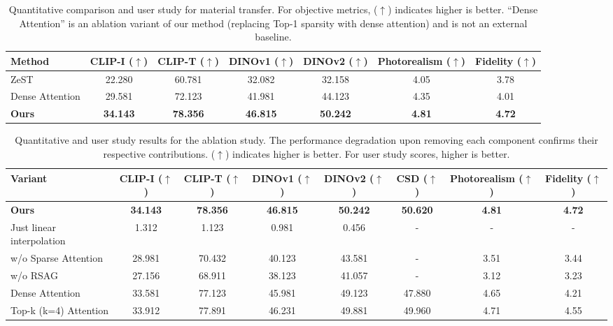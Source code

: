 \begin{table}[htbp]
\centering
\small
\begin{tabular}{lcccccc}
\toprule
Method  & CLIP-I ($\uparrow$) & CLIP-T ($\uparrow$) & DINOv1 ($\uparrow$) & DINOv2 ($\uparrow$) & Photorealism ($\uparrow$) & Fidelity ($\uparrow$) \\
\midrule
ZeST  & 22.280 & 60.781 & 32.082 & 32.158 & 4.05 & 3.78 \\
Dense Attention & 29.581 & 72.123 & 41.981 & 44.123 & 4.35 & 4.01 \\
\textbf{Ours}  & \textbf{34.143} & \textbf{78.356} & \textbf{46.815} & \textbf{50.242} & \textbf{4.81} & \textbf{4.72} \\
\bottomrule
\end{tabular}

\caption{Quantitative comparison and user study for material transfer. For objective metrics, ($\uparrow$) indicates higher is better. ``Dense Attention'' is an ablation variant of our method (replacing Top-1 sparsity with dense attention) and is not an external baseline.}
\label{tab:material_transfer_metrics}
\end{table}

\begin{table}[!h]
\centering
\small
\begin{tabular}{lccccccc}
\toprule
Variant & CLIP-I ($\uparrow$) & CLIP-T ($\uparrow$) & DINOv1 ($\uparrow$) & DINOv2 ($\uparrow$) & CSD ($\uparrow$) & Photorealism ($\uparrow$) & Fidelity ($\uparrow$) \\
\midrule
\textbf{Ours} & \textbf{34.143} & \textbf{78.356} & \textbf{46.815} & \textbf{50.242} & \textbf{50.620} & \textbf{4.81} & \textbf{4.72} \\
 Just linear interpolation & 1.312 & 1.123 & 0.981 & 0.456 & - & - & - \\
w/o Sparse Attention & 28.981 & 70.432 & 40.123 & 43.581 & - & 3.51 & 3.44 \\
w/o RSAG & 27.156 & 68.911 & 38.123 & 41.057 & - & 3.12 & 3.23 \\
\midrule
Dense Attention & 33.581 & 77.123 & 45.981 & 49.123 & 47.880 & 4.65 & 4.21 \\
Top-k (k=4) Attention & 33.912 & 77.891 & 46.231 & 49.881 & 49.960 & 4.71 & 4.55 \\
\bottomrule
\end{tabular}
\caption{Quantitative and user study results for the ablation study. The performance degradation upon removing each component confirms their respective contributions. ($\uparrow$) indicates higher is better. For user study scores, higher is better.}
\label{tab:ablation_metrics}
\end{table}


